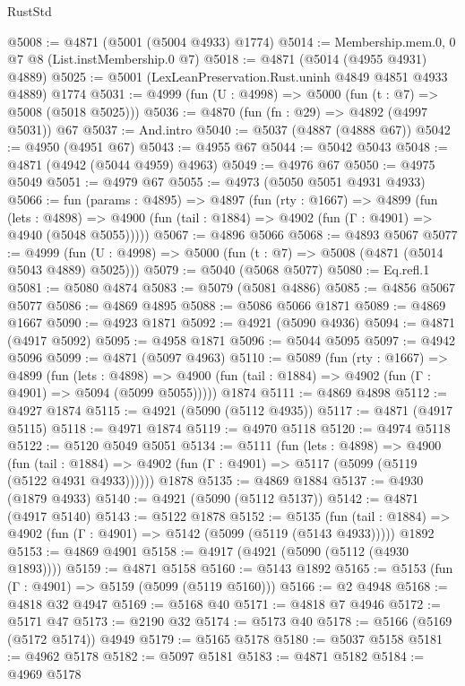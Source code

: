 \begin{lexlean}{RustStd}
\begin{coremodule}
@5008 := @4871 (@5001 (@5004 @4933) @1774)
@5014 := Membership.mem.{0, 0} @7 @8 (List.instMembership.{0} @7)
@5018 := @4871 (@5014 (@4955 @4931) @4889)
@5025 := @5001 (LexLeanPreservation.Rust.uninh @4849 @4851 @4933 @4889) @1774
@5031 := @4999 (fun (U : @4998) => @5000 (fun (t : @7) => @5008 (@5018 @5025)))
@5036 := @4870 (fun (fn : @29) => @4892 (@4997 @5031)) @67
@5037 := And.intro
@5040 := @5037 (@4887 (@4888 @67))
@5042 := @4950 (@4951 @67)
@5043 := @4955 @67
@5044 := @5042 @5043
@5048 := @4871 (@4942 (@5044 @4959) @4963)
@5049 := @4976 @67
@5050 := @4975 @5049
@5051 := @4979 @67
@5055 := @4973 (@5050 @5051 @4931 @4933)
@5066 := fun (params : @4895) =>
  @4897
    (fun (rty : @1667) =>
    @4899
      (fun (lets : @4898) =>
      @4900 (fun (tail : @1884) => @4902 (fun (Γ : @4901) => @4940 (@5048 @5055)))))
@5067 := @4896 @5066
@5068 := @4893 @5067
@5077 := @4999 (fun (U : @4998) => @5000 (fun (t : @7) => @5008 (@4871 (@5014 @5043 @4889) @5025)))
@5079 := @5040 (@5068 @5077)
@5080 := Eq.refl.{1}
@5081 := @5080 @4874
@5083 := @5079 (@5081 @4886)
@5085 := @4856 @5067 @5077
@5086 := @4869 @4895
@5088 := @5086 @5066 @1871
@5089 := @4869 @1667
@5090 := @4923 @1871
@5092 := @4921 (@5090 @4936)
@5094 := @4871 (@4917 @5092)
@5095 := @4958 @1871
@5096 := @5044 @5095
@5097 := @4942 @5096
@5099 := @4871 (@5097 @4963)
@5110 := @5089
    (fun (rty : @1667) =>
    @4899
      (fun (lets : @4898) =>
      @4900 (fun (tail : @1884) => @4902 (fun (Γ : @4901) => @5094 (@5099 @5055)))))
    @1874
@5111 := @4869 @4898
@5112 := @4927 @1874
@5115 := @4921 (@5090 (@5112 @4935))
@5117 := @4871 (@4917 @5115)
@5118 := @4971 @1874
@5119 := @4970 @5118
@5120 := @4974 @5118
@5122 := @5120 @5049 @5051
@5134 := @5111
    (fun (lets : @4898) =>
    @4900
      (fun (tail : @1884) => @4902 (fun (Γ : @4901) => @5117 (@5099 (@5119 (@5122 @4931 @4933))))))
    @1878
@5135 := @4869 @1884
@5137 := @4930 (@1879 @4933)
@5140 := @4921 (@5090 (@5112 @5137))
@5142 := @4871 (@4917 @5140)
@5143 := @5122 @1878
@5152 := @5135
    (fun (tail : @1884) => @4902 (fun (Γ : @4901) => @5142 (@5099 (@5119 (@5143 @4933)))))
    @1892
@5153 := @4869 @4901
@5158 := @4917 (@4921 (@5090 (@5112 (@4930 @1893))))
@5159 := @4871 @5158
@5160 := @5143 @1892
@5165 := @5153 (fun (Γ : @4901) => @5159 (@5099 (@5119 @5160)))
@5166 := @2 @4948
@5168 := @4818 @32 @4947
@5169 := @5168 @40
@5171 := @4818 @7 @4946
@5172 := @5171 @47
@5173 := @2190 @32
@5174 := @5173 @40
@5178 := @5166 (@5169 (@5172 @5174)) @4949
@5179 := @5165 @5178
@5180 := @5037 @5158
@5181 := @4962 @5178
@5182 := @5097 @5181
@5183 := @4871 @5182
@5184 := @4969 @5178

\end{coremodule}
\end{lexlean}
